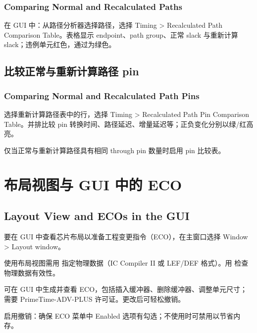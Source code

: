 \subsubsection*{Comparing Normal and Recalculated Paths}

在 GUI 中：从路径分析器选择路径，选择 Timing > Recalculated Path Comparison Table。表格显示 endpoint、path group、正常 slack 与重新计算 slack；违例单元红色，通过为绿色。


\subsection{比较正常与重新计算路径 pin}
\subsubsection*{Comparing Normal and Recalculated Path Pins}

选择重新计算路径表中的行，选择 Timing > Recalculated Path Pin Comparison Table。并排比较 pin 转换时间、路径延迟、增量延迟等；正负变化分别以绿/红高亮。

仅当正常与重新计算路径具有相同 through pin 数量时启用 pin 比较表。


\section{布局视图与 GUI 中的 ECO}
\subsection*{Layout View and ECOs in the GUI}

要在 GUI 中查看芯片布局以准备工程变更指令（ECO），在主窗口选择 Window > Layout window。

使用布局视图需用  指定物理数据（IC Compiler II 或 LEF/DEF 格式）。用  检查物理数据有效性。

可在 GUI 中生成并查看 ECO，包括插入缓冲器、删除缓冲器、调整单元尺寸；需要 PrimeTime-ADV-PLUS 许可证。更改后可轻松撤销。



启用撤销：确保 ECO 菜单中 Enabled 选项有勾选；不使用时可禁用以节省内存。

